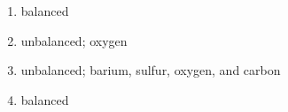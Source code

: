 \begin{Answer}[ref = balance]
\begin{enumerate}
\item balanced
\item unbalanced; oxygen
\item unbalanced; barium, sulfur, oxygen, and carbon
\item balanced
\end{enumerate}
\end{Answer}

